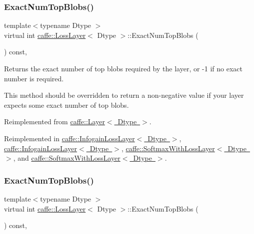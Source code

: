 \subsubsection{\texorpdfstring{Exact\+Num\+Top\+Blobs()}{ExactNumTopBlobs()}\hspace{0.1cm}{\footnotesize\ttfamily [1/2]}}
{\footnotesize\ttfamily template$<$typename Dtype $>$ \\
virtual int \mbox{\hyperlink{classcaffe_1_1_loss_layer}{caffe\+::\+Loss\+Layer}}$<$ Dtype $>$\+::Exact\+Num\+Top\+Blobs (\begin{DoxyParamCaption}{ }\end{DoxyParamCaption}) const\hspace{0.3cm}{\ttfamily [inline]}, {\ttfamily [virtual]}}



Returns the exact number of top blobs required by the layer, or -\/1 if no exact number is required. 

This method should be overridden to return a non-\/negative value if your layer expects some exact number of top blobs. 

Reimplemented from \mbox{\hyperlink{classcaffe_1_1_layer_a64e2ca72c719e4b2f1f9216ccfb0d37f}{caffe\+::\+Layer$<$ Dtype $>$}}.



Reimplemented in \mbox{\hyperlink{classcaffe_1_1_infogain_loss_layer_aaf55e75f2296586b1fee0175e2d72fbb}{caffe\+::\+Infogain\+Loss\+Layer$<$ Dtype $>$}}, \mbox{\hyperlink{classcaffe_1_1_infogain_loss_layer_aaf55e75f2296586b1fee0175e2d72fbb}{caffe\+::\+Infogain\+Loss\+Layer$<$ Dtype $>$}}, \mbox{\hyperlink{classcaffe_1_1_softmax_with_loss_layer_a9035d000b2ce51a973f255a5eb2df8e3}{caffe\+::\+Softmax\+With\+Loss\+Layer$<$ Dtype $>$}}, and \mbox{\hyperlink{classcaffe_1_1_softmax_with_loss_layer_a9035d000b2ce51a973f255a5eb2df8e3}{caffe\+::\+Softmax\+With\+Loss\+Layer$<$ Dtype $>$}}.

\mbox{\label{classcaffe_1_1_loss_layer_aa5d5ab714a14082f5343dc9c49025b23}} 
\subsubsection{\texorpdfstring{Exact\+Num\+Top\+Blobs()}{ExactNumTopBlobs()}\hspace{0.1cm}{\footnotesize\ttfamily [2/2]}}
{\footnotesize\ttfamily template$<$typename Dtype $>$ \\
virtual int \mbox{\hyperlink{classcaffe_1_1_loss_layer}{caffe\+::\+Loss\+Layer}}$<$ Dtype $>$\+::Exact\+Num\+Top\+Blobs (\begin{DoxyParamCaption}{ }\end{DoxyParamCaption}) const\hspace{0.3cm}{\ttfamily [inline]}, {\ttfamily [virtual]}}



